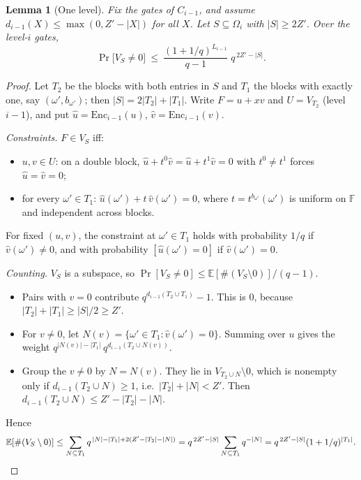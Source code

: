 \documentclass[11pt]{article}
\newtheorem{lemma}[theorem]{Lemma}
\theoremstyle{definition}
\newcommand{\F}{\mathbb{F}}
\newcommand{\Enc}{\mathrm{Enc}}
\begin{document}
\begin{lemma}[One level]\label{lem:onelevel}
Fix the gates of $C_{i-1}$, and assume $d_{i-1}(X)\le\max(0,Z'-|X|)$ for all $X$. Let
$S\subseteq\Omega_i$ with $|S|\ge2Z'$. Over the level-$i$ gates,
\[
\Pr\bigl[V_S\neq0\bigr]\ \le\ \frac{(1+1/q)^{L_{i-1}}}{q-1}\;q^{\,2Z'-|S|}.
\]
\end{lemma}
\begin{proof}
Let $T_2$ be the blocks with both entries in $S$ and $T_1$ the blocks with exactly one, say
$(\omega',b_{\omega'})$; then $|S|=2|T_2|+|T_1|$. Write $F=u+xv$ and $U=V_{T_2}$ (level $i-1$),
and put $\hat u=\Enc_{i-1}(u)$, $\hat v=\Enc_{i-1}(v)$.

\emph{Constraints.} $F\in V_S$ iff:
\begin{itemize}[leftmargin=*]
\item $u,v\in U$: on a double block, $\hat u+t^0\hat v=\hat u+t^1\hat v=0$ with $t^0\neq t^1$ forces
$\hat u=\hat v=0$;
\item for every $\omega'\in T_1$: $\hat u(\omega')+t\,\hat v(\omega')=0$, where
$t=t^{b_{\omega'}}(\omega')$ is uniform on $\F$ and independent across blocks.
\end{itemize}
For fixed $(u,v)$, the constraint at $\omega'\in T_1$ holds with probability $1/q$ if
$\hat v(\omega')\neq0$, and with probability $[\hat u(\omega')=0]$ if $\hat v(\omega')=0$.

\emph{Counting.} $V_S$ is a subspace, so $\Pr[V_S\neq0]\le\mathbb{E}[\#(V_S\setminus0)]/(q-1)$.
\begin{itemize}[leftmargin=*]
\item Pairs with $v=0$ contribute $q^{d_{i-1}(T_2\cup T_1)}-1$. This is $0$, because
$|T_2|+|T_1|\ge|S|/2\ge Z'$.
\item For $v\neq0$, let $N(v)=\{\omega'\in T_1:\hat v(\omega')=0\}$. Summing over $u$ gives the weight
$q^{|N(v)|-|T_1|}\,q^{d_{i-1}(T_2\cup N(v))}$.
\item Group the $v\neq0$ by $N=N(v)$. They lie in $V_{T_2\cup N}\setminus0$, which is nonempty only
if $d_{i-1}(T_2\cup N)\ge1$, i.e.\ $|T_2|+|N|<Z'$. Then $d_{i-1}(T_2\cup N)\le Z'-|T_2|-|N|$.
\end{itemize}
Hence
\[
\mathbb{E}[\#(V_S\setminus0)]\le\sum_{N\subseteq T_1}q^{\,|N|-|T_1|+2(Z'-|T_2|-|N|)}
=q^{\,2Z'-|S|}\sum_{N\subseteq T_1}q^{-|N|}=q^{\,2Z'-|S|}(1+1/q)^{|T_1|}.\qedhere
\]
\end{proof}
\end{document}
